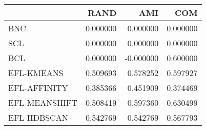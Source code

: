 \begin{tabular}{lrrr}
\toprule
 & RAND & AMI & COM \\
\midrule
BNC & 0.000000 & 0.000000 & 0.000000 \\
SCL & 0.000000 & 0.000000 & 0.000000 \\
BCL & 0.000000 & -0.000000 & 0.600000 \\
EFL-KMEANS & 0.509693 & 0.578252 & 0.597927 \\
EFL-AFFINITY & 0.385366 & 0.451909 & 0.374469 \\
EFL-MEANSHIFT & 0.508419 & 0.597360 & 0.630499 \\
EFL-HDBSCAN & 0.542769 & 0.542769 & 0.567793 \\
\bottomrule
\end{tabular}
